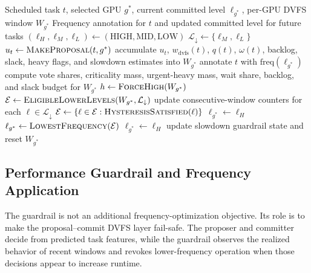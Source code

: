 \figMethodsDvfsStateMachine

\begin{algorithm}[t]
\caption{Windowed DVFS proposal and commit}
\label{alg:dvfs-proposal-commit}
\begin{algorithmic}[1]
\Require Scheduled task $t$, selected GPU $g^{*}$, current committed level $\ell_{g^{*}}$, per-GPU DVFS window $W_{g^{*}}$
\Ensure Frequency annotation for $t$ and updated committed level for future tasks
\State $(\ell_H,\ell_M,\ell_L)\gets(\mathrm{HIGH},\mathrm{MID},\mathrm{LOW})$
\State $\mathcal{L}_{\downarrow}\gets\{\ell_M,\ell_L\}$ 
\State $u_t\gets\Call{MakeProposal}{t,g^{*}}$ 
\State accumulate $u_t$, $w_{\mathrm{dvfs}}(t)$, $q(t)$, $\omega(t)$, backlog, slack, heavy flags, and slowdown estimates into $W_{g^{*}}$
\State annotate $t$ with $\mathrm{freq}(\ell_{g^{*}})$
    \State \Return
\EndIf
\State compute vote shares, criticality mass, urgent-heavy mass, wait share, backlog, and slack budget for $W_{g^{*}}$
\State $h\gets\Call{ForceHigh}{W_{g^{*}}}$ 
\State $\mathcal{E}\gets\Call{EligibleLowerLevels}{W_{g^{*}},\mathcal{L}_{\downarrow}}$
\State update consecutive-window counters for each $\ell\in\mathcal{L}_{\downarrow}$
\State $\mathcal{E}\gets\{\ell\in\mathcal{E}:\Call{HysteresisSatisfied}{\ell}\}$
    \State $\ell_{g^{*}}\gets\ell_H$
    \State $\ell_{g^{*}}\gets\Call{LowestFrequency}{\mathcal{E}}$ 
\Else
    \State $\ell_{g^{*}}\gets\ell_H$
\EndIf
\State update slowdown guardrail state and reset $W_{g^{*}}$
\end{algorithmic}
\end{algorithm}

\subsection{Performance Guardrail and Frequency Application}
\label{subsec:methods-dvfs-application}

The guardrail is not an additional frequency-optimization objective. Its role is to make the proposal--commit DVFS layer fail-safe. The proposer and committer decide from predicted task features, while the guardrail observes the realized behavior of recent windows and revokes lower-frequency operation when those decisions appear to increase runtime.

